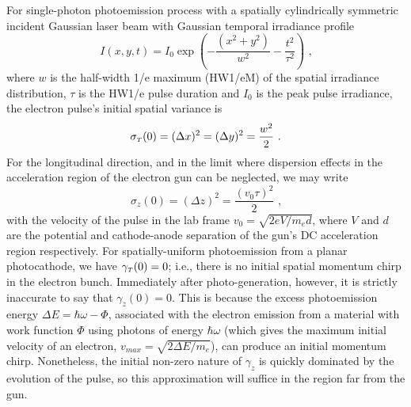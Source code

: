 For single-photon photoemission process with a spatially cylindrically symmetric incident Gaussian laser beam with Gaussian temporal irradiance profile 
\begin{equation}\label{eq:laser_form}
I ( x , y , t ) = I_{0} \exp \left ( - \frac{ ( x^{2} +y^{2} ) }{ w^{2} } - \frac{ t^{ 2 } }{ \tau^{ 2 } } \right ) \text{ ,}
\end{equation}
where $w$ is the half-width 1/e maximum (HW1/eM) of the spatial irradiance distribution, $\tau$ is the HW1/e pulse duration and $I_{0}$ is the peak pulse irradiance, the electron pulse's initial spatial variance is
\begin{equation}
\sigma_{{\scriptscriptstyle T} } ( 0 ) = ( \Delta x )^{2} = ( \Delta y)^{2} = \frac{ w^{2} }{ 2 } \text{ .}
\end{equation}
For the longitudinal direction, and in the limit where dispersion effects in the acceleration region of the electron gun can be neglected, we may write
\begin{equation} \label{eq:initial_sigma_z}
\sigma_{ z } ( 0 ) = ( \Delta z)^{2} = \frac{ ( v_{{ \scriptscriptstyle 0}} \tau )^{2} }{ 2 } \text{ ,}
\end{equation}
with the velocity of the pulse in the lab frame $v_{{ \scriptscriptstyle 0}} = \sqrt{ 2 e V / m_{e} d } $, where $ V $ and $ d $ are the potential and cathode-anode separation of the gun's DC acceleration region respectively.
For spatially-uniform photoemission from a planar photocathode, we have $ \gamma_{{\scriptscriptstyle T}} ( 0 ) = 0 $; i.e., there is no initial spatial momentum chirp in the electron bunch.
Immediately after photo-generation, however, it is strictly inaccurate to say that $ \gamma_{ z } ( 0 ) = 0 $.
This is because the excess photoemission energy $ \Delta E = \hbar \omega - \Phi $, associated with the electron emission from a material with work function $\Phi$ using photons of energy $ \hbar \omega $ (which gives the maximum initial velocity of an electron, $ v_{max} = \sqrt{ 2 \Delta E/m_{e} } $), can produce an initial momentum chirp.
Nonetheless, the initial non-zero nature of $ \gamma_{z} $ is quickly dominated by the evolution of the pulse, so this approximation will suffice in the region far from the gun.

